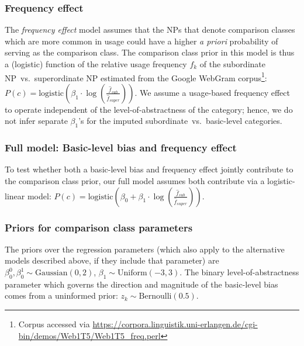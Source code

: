 \documentclass[doc]{apa6}
\begin{document}
\subsubsection{Frequency effect}

The \emph{frequency effect} model assumes that the NPs that denote comparison classes which are more common in usage could have a higher \emph{a priori} probability of serving as the comparison class. 
The comparison class prior in this model is thus a (logistic) function of the relative usage frequency $f_k$ of the subordinate NP~vs.~superordinate NP estimated from the Google WebGram corpus\footnote{Corpus accessed via
\url{https://corpora.linguistik.uni-erlangen.de/cgi-bin/demos/Web1T5/Web1T5_freq.perl}}: $P(c) = \text{logistic}(\beta_1\cdot \log (\frac{\hat{f}_{sub}}{\hat{f}_{super}}))$.
We assume a usage-based frequency effect to operate independent of the level-of-abstractness of the category; hence, we do not infer separate $\beta_1$'s for the imputed subordinate~vs.~basic-level categories. 


\subsubsection{Full model: Basic-level bias and frequency effect}

To test whether both a basic-level bias and frequency effect jointly contribute to the comparison class prior, our full model assumes both contribute via a logistic-linear model: $P(c) = \text{logistic}(\beta_0 + \beta_1\cdot \log (\frac{\hat{f}_{sub}}{\hat{f}_{super}}))$.

\subsubsection{Priors for comparison class parameters}

The priors over the regression parameters (which also apply to the alternative models described above, if they include that parameter) are $\beta^0_0 , \beta^1_0\sim \text{Gaussian}(0, 2)$, $\beta_1 \sim \text{Uniform}(-3, 3)$. 
The binary level-of-abstractness parameter which governs the direction and magnitude of the basic-level bias comes from a uninformed prior: $z_{k} \sim \text{Bernoulli}(0.5)$. 


\end{document}
